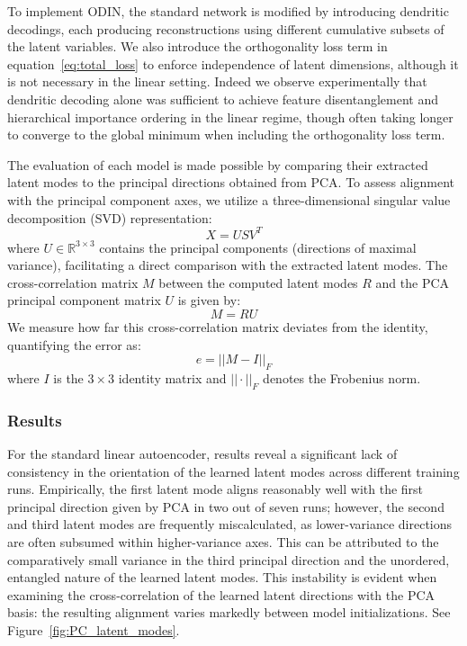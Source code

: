 \documentclass[twoside,11pt]{article}
\begin{document}
To implement ODIN, the standard network is modified by introducing dendritic decodings, each producing reconstructions using different cumulative subsets of the latent variables. We also introduce the orthogonality loss term in equation~\ref{eq:total_loss} to enforce independence of latent dimensions, although it is not necessary in the linear setting. Indeed we observe experimentally that dendritic decoding alone was sufficient to achieve feature disentanglement and hierarchical importance ordering in the linear regime, though often taking longer to converge to the global minimum when including the orthogonality loss term.

The evaluation of each model is made possible by comparing their extracted latent modes to the principal directions obtained from PCA. To assess alignment with the principal component axes, we utilize a three-dimensional singular value decomposition (SVD) representation:
\begin{equation}
    X = US V^T
\end{equation}
where $U\in \mathbb{R}^{3\times 3}$ contains the principal components (directions of maximal variance), facilitating a direct comparison with the extracted latent modes. The cross-correlation matrix $M$ between the computed latent modes $R$ and the PCA principal component matrix $U$ is given by:
\begin{equation}
    M = RU
\end{equation}
We measure how far this cross-correlation matrix deviates from the identity, quantifying the error as:
\begin{equation}
    e = ||M-I||_F
    \label{eq:correlation_error}
\end{equation}
where $I$ is the $3\times 3$ identity matrix and $||\cdot ||_F$ denotes the Frobenius norm.

\subsubsection*{Results}

For the standard linear autoencoder, results reveal a significant lack of consistency in the orientation of the learned latent modes across different training runs. Empirically, the first latent mode aligns reasonably well with the first principal direction given by PCA in two out of seven runs; however, the second and third latent modes are frequently miscalculated, as lower-variance directions are often subsumed within higher-variance axes. This can be attributed to the comparatively small variance in the third principal direction and the unordered, entangled nature of the learned latent modes. This instability is evident when examining the cross-correlation of the learned latent directions with the PCA basis: the resulting alignment varies markedly between model initializations. See Figure~\ref{fig:PC_latent_modes}.
\end{document}
